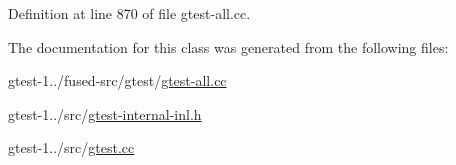 \-Definition at line 870 of file gtest-\/all.\-cc.



\-The documentation for this class was generated from the following files\-:\begin{DoxyCompactItemize}
\item 
gtest-\/1../fused-\/src/gtest/\hyperlink{fused-src_2gtest_2gtest-all_8cc}{gtest-\/all.\-cc}\item 
gtest-\/1../src/\hyperlink{gtest-internal-inl_8h}{gtest-\/internal-\/inl.\-h}\item 
gtest-\/1../src/\hyperlink{gtest_8cc}{gtest.\-cc}\end{DoxyCompactItemize}
